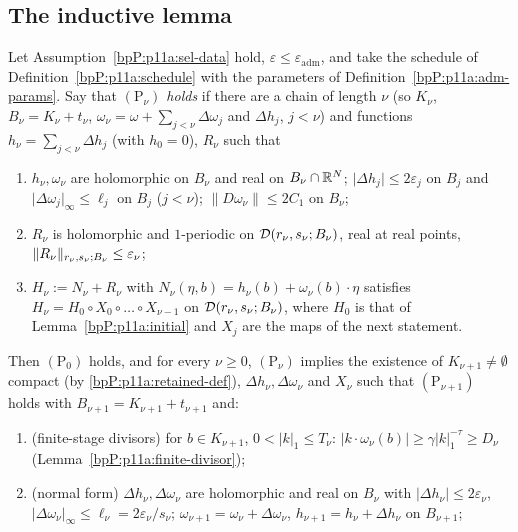 \subsection{The inductive lemma}\label{bpP:p11a:sec-induct}

\begin{proposition}\label{bpP:p11a:inductive-lemma}
Let Assumption~\ref{bpP:p11a:sel-data} hold, $\varepsilon\le\varepsilon_{\mathrm{adm}}$, and take the schedule of Definition~\ref{bpP:p11a:schedule} with the parameters of Definition~\ref{bpP:p11a:adm-params}. Say that \emph{$(\mathrm P_\nu)$ holds} if there are a chain of length $\nu$ (so $K_\nu$, $B_\nu=K_\nu+t_\nu$, $\omega_\nu=\omega+\sum_{j<\nu}\Delta\omega_j$ and $\Delta h_j$, $j<\nu$) and functions $h_\nu=\sum_{j<\nu}\Delta h_j$ (with $h_0=0$), $R_\nu$ such that
\begin{enumerate}[label=(\alph*)]
\item $h_\nu,\omega_\nu$ are holomorphic on $B_\nu$ and real on $B_\nu\cap\mathbb{R}^N$; $\lvert\Delta h_j\rvert\le2\varepsilon_j$ on $B_j$ and $\lvert\Delta\omega_j\rvert_\infty\le\ell_j$ on $B_j$ ($j<\nu$); $\lVert D\omega_\nu\rVert\le2C_1$ on $B_\nu$;
\item $R_\nu$ is holomorphic and $1$-periodic on $\mathcal D(r_\nu,s_\nu;B_\nu)$, real at real points, $\lVert R_\nu\rVert_{r_\nu,s_\nu;B_\nu}\le\varepsilon_\nu$;
\item $H_\nu:=N_\nu+R_\nu$ with $N_\nu(\eta,b)=h_\nu(b)+\omega_\nu(b)\cdot\eta$ satisfies $H_\nu=H_0\circ X_0\circ\dots\circ X_{\nu-1}$ on $\mathcal D(r_\nu,s_\nu;B_\nu)$, where $H_0$ is that of Lemma~\ref{bpP:p11a:initial} and $X_j$ are the maps of the next statement.
\end{enumerate}
Then $(\mathrm P_0)$ holds, and for every $\nu\ge0$, $(\mathrm P_\nu)$ implies the existence of $K_{\nu+1}\ne\emptyset$ compact (by \eqref{bpP:p11a:retained-def}), $\Delta h_\nu,\Delta\omega_\nu$ and $X_\nu$ such that $(\mathrm P_{\nu+1})$ holds with $B_{\nu+1}=K_{\nu+1}+t_{\nu+1}$ and:
\begin{enumerate}[label=(O\arabic*),ref=(O\arabic*)]
\item\label{bpP:p11a:O1} (finite-stage divisors) for $b\in K_{\nu+1}$, $0<\lvert k\rvert_1\le T_\nu$: $\lvert k\cdot\omega_\nu(b)\rvert\ge\gamma\lvert k\rvert_1^{-\tau}\ge D_\nu$ (Lemma~\ref{bpP:p11a:finite-divisor});
\item\label{bpP:p11a:O2} (normal form) $\Delta h_\nu,\Delta\omega_\nu$ are holomorphic and real on $B_\nu$ with $\lvert\Delta h_\nu\rvert\le2\varepsilon_\nu$, $\lvert\Delta\omega_\nu\rvert_\infty\le\ell_\nu=2\varepsilon_\nu/s_\nu$; $\omega_{\nu+1}=\omega_\nu+\Delta\omega_\nu$, $h_{\nu+1}=h_\nu+\Delta h_\nu$ on $B_{\nu+1}$;

\end{enumerate}
\end{proposition}

